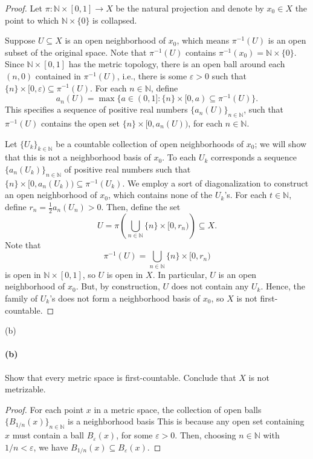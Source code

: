 \documentclass[12pt]{article}
\newlength{\myparskip}
\newenvironment{fullbox}{\begin{lrbox}{\savefullbox}\begin{minipage}{\dimexpr\textwidth-2\fboxsep\relax}\setlength{\parskip}{\myparskip}}{\end{minipage}\end{lrbox}\framebox[\textwidth]{\usebox{\savefullbox}}}
\newenvironment{pbox}[1][]{\begin{fullbox}\ifx#1\empty\else\paragraph{#1}\fi}{\end{fullbox}}
\newcommand{\N}{\mathbb{N}}
\newcommand{\eps}{\varepsilon}
\newcommand{\<}{\langle}
\renewcommand{\>}{\rangle}
\theoremstyle{definition}
\begin{document}
\begin{proof}
    Let $\pi : \N \times [0, 1] \to X$ be the natural projection and denote by $x_0 \in X$ the point to which $\N \times \{0\}$ is collapsed.

    Suppose $U \subseteq X$ is an open neighborhood of $x_0$, which means $\pi^{-1}(U)$ is an open subset of the original space. Note that $\pi^{-1}(U)$ contains $\pi^{-1}(x_0) = \N \times \{0\}$. Since $\N \times [0, 1]$ has the metric topology, there is an open ball around each $(n, 0)$ contained in $\pi^{-1}(U)$, i.e., there is some $\eps > 0$ such that $\{n\} \times [0, \eps) \subseteq \pi^{-1}(U)$. For each $n \in \N$, define
    \[
        a_n(U) = \max\{a \in (0, 1] : \{n\} \times [0, a) \subseteq \pi^{-1}(U)\}.
    \]
    This specifies a sequence of positive real numbers $\{a_n(U)\}_{n \in \N}$, such that $\pi^{-1}(U)$ contains the open set $\{n\} \times [0, a_n(U))$, for each $n \in \N$. 
    
    Let $\{U_k\}_{k \in \N}$ be a countable collection of open neighborhoods of $x_0$; we will show that this is not a neighborhood basis of $x_0$. To each $U_k$ corresponds a sequence $\{a_n(U_k)\}_{n \in \N}$ of positive real numbers such that $\{n\} \times [0, a_n(U_k)) \subseteq \pi^{-1}(U_k)$. We employ a sort of diagonalization to construct an open neighborhood of $x_0$, which contains none of the $U_k$'s. For each $t \in \N$, define $r_n = \frac{1}{2}a_n(U_n) > 0$. Then, define the set
    \[
        U = \pi\!\left(\bigcup_{n \in \N} \{n\} \times [0, r_n)\right) \subseteq X.
    \]
    Note that
    \[
        \pi^{-1}(U) = \bigcup_{n \in \N} \{n\} \times [0, r_n)
    \]
    is open in $\N \times [0, 1]$, so $U$ is open in $X$. In particular, $U$ is an open neighborhood of $x_0$. But, by construction, $U$ does not contain any $U_k$. Hence, the family of $U_k$'s does not form a neighborhood basis of $x_0$, so $X$ is not first-countable.

\end{proof}

\begin{pbox}[(b)]
    Show that every metric space is first-countable.  Conclude that $X$ is not metrizable.
\end{pbox}

\begin{proof}
    For each point $x$ in a metric space, the collection of open balls $\{B_{1/n}(x)\}_{n \in \N}$ is a neighborhood basis This is because any open set containing $x$ must contain a ball $B_\eps(x)$, for some $\eps > 0$. Then, choosing $n \in \N$ with $1/n < \eps$, we have $B_{1/n}(x) \subseteq B_\eps(x)$.

\end{proof}
\end{document}
